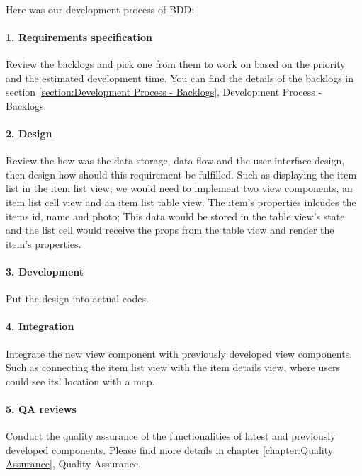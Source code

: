 \documentclass[12pt,a4paper]{article}
\begin{document}
          \paragraph{}Here was our development process of BDD:
          
          \paragraph{1. Requirements specification}Review the backlogs and pick one from them to work on based on the priority and the estimated development time. You can find the details of the backlogs in section \ref{section:Development Process - Backlogs}, Development Process - Backlogs.
          
          \paragraph{2. Design}Review the how was the data storage, data flow and the user interface design, then design how should this requirement be fulfilled. Such as displaying the item list in the item list view, we would need to implement two view components, an item list cell view and an item list table view. The item's properties inlcudes the items id, name and photo; This data would be stored in the table view's state and the list cell would receive the props from the table view and render the item's properties.
          
          \paragraph{3. Development}Put the design into actual codes.
          
          \paragraph{4. Integration}Integrate the new view component with previously developed view components. Such as connecting the item list view with the item details view, where users could see its' location with a map.
          
          \paragraph{5. QA reviews}Conduct the quality assurance of the functionalities of latest and previously developed components. Please find more details in chapter \ref{chapter:Quality Assurance}, Quality Assurance.
          
\end{document}

